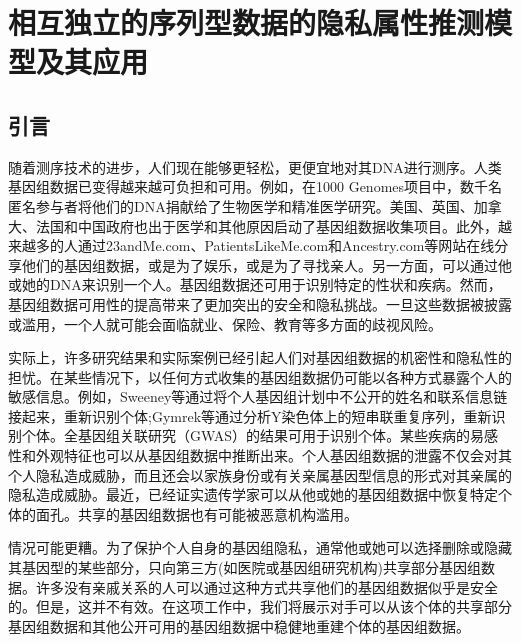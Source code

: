 \chapter{相互独立的序列型数据的隐私属性推测模型及其应用}
\label{chap:inference-attack-on-norelated-sequenced-data}

\section{引言}\label{sec:intro}

随着测序技术的进步，人们现在能够更轻松，更便宜地对其DNA进行测序。人类基因组数据已变得越来越可负担和可用。例如，在1000 Genomes项目\cite{gpc2015global}中，数千名匿名参与者将他们的DNA捐献给了生物医学和精准医学研究。美国、英国、加拿大、法国和中国政府也出于医学和其他原因启动了基因组数据收集项目。此外，越来越多的人通过23andMe.com、PatientsLikeMe.com和Ancestry.com等网站在线分享他们的基因组数据，或是为了娱乐，或是为了寻找亲人。另一方面，可以通过他或她的DNA来识别一个人。基因组数据还可用于识别特定的性状和疾病。然而，基因组数据可用性的提高带来了更加突出的安全和隐私挑战。一旦这些数据被披露或滥用，一个人就可能会面临就业、保险、教育等多方面的歧视风险\cite{eeoc2008genetic}。

实际上，许多研究结果和实际案例已经引起人们对基因组数据的机密性和隐私性的担忧。在某些情况下，以任何方式收集的基因组数据仍可能以各种方式暴露个人的敏感信息。例如，Sweeney等\cite{sweeney2013identifying}通过将个人基因组计划中不公开的姓名和联系信息链接起来，重新识别个体;Gymrek等\cite{gymrek2013identifying}通过分析Y染色体上的短串联重复序列，重新识别个体。全基因组关联研究（GWAS）的结果可用于识别个体\cite{cai2015deterministic}。某些疾病的易感性\cite{shringarpure2015privacy}和外观特征\cite{walsh2011irisplex}也可以从基因组数据中推断出来。个人基因组数据的泄露不仅会对其个人隐私造成威胁，而且还会以家族身份\cite{rohlfs2012familial}或有关亲属基因型信息的形式对其亲属的隐私造成威胁\cite{humbert2013addressing}。最近，已经证实遗传学家可以从他或她的基因组数据中恢复特定个体的面孔\cite{hess2017controversial}。共享的基因组数据也有可能被恶意机构滥用\cite{scutti2018what}。

情况可能更糟。为了保护个人自身的基因组隐私，通常他或她可以选择删除或隐藏其基因型的某些部分\cite{shi2017overview}，只向第三方(如医院或基因组研究机构)共享部分基因组数据。许多没有亲戚关系的人可以通过这种方式共享他们的基因组数据似乎是安全的。但是，这并不有效。在这项工作中，我们将展示对手可以从该个体的共享部分基因组数据和其他公开可用的基因组数据中稳健地重建个体的基因组数据。

